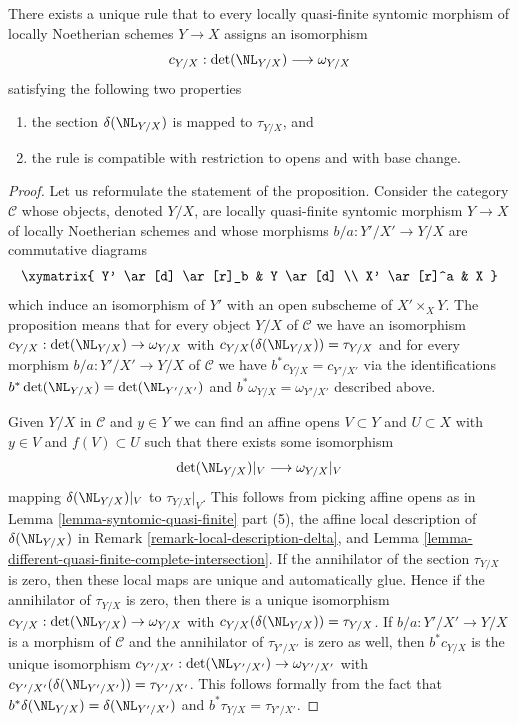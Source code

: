 \begin{proposition}
\label{proposition-tate-map}
There exists a unique rule that to every locally quasi-finite syntomic
morphism of locally Noetherian schemes $Y \to X$ assigns an isomorphism
$$
c_{Y/X} : \det(\NL_{Y/X}) \longrightarrow \omega_{Y/X}
$$
satisfying the following two properties
\begin{enumerate}
\item the section $\delta(\NL_{Y/X})$ is mapped to $\tau_{Y/X}$, and
\item the rule is compatible with restriction to opens and with
base change.
\end{enumerate}
\end{proposition}

\begin{proof}
Let us reformulate the statement of the proposition. Consider the category
$\mathcal{C}$ whose objects, denoted $Y/X$, are locally quasi-finite syntomic
morphism $Y \to X$ of locally Noetherian schemes and whose morphisms
$b/a : Y'/X' \to Y/X$ are commutative diagrams
$$
\xymatrix{
Y' \ar[d] \ar[r]_b & Y \ar[d] \\
X' \ar[r]^a & X
}
$$
which induce an isomorphism of $Y'$ with an open subscheme of
$X' \times_X Y$. The proposition means that for every object
$Y/X$ of $\mathcal{C}$ we have an isomorphism
$c_{Y/X} : \det(\NL_{Y/X}) \to \omega_{Y/X}$
with $c_{Y/X}(\delta(\NL_{Y/X})) = \tau_{Y/X}$
and for every morphism $b/a : Y'/X' \to Y/X$ of $\mathcal{C}$ we have
$b^*c_{Y/X} = c_{Y'/X'}$ via the identifications
$b^*\det(\NL_{Y/X}) = \det(\NL_{Y'/X'})$ and
$b^*\omega_{Y/X} = \omega_{Y'/X'}$ described above.

\medskip\noindent
Given $Y/X$ in $\mathcal{C}$ and $y \in Y$ we can find
an affine opens $V \subset Y$ and $U \subset X$ with
$y \in V$ and $f(V) \subset U$
such that there exists some isomorphism
$$
\det(\NL_{Y/X})|_V \longrightarrow \omega_{Y/X}|_V
$$
mapping $\delta(\NL_{Y/X})|_V$ to $\tau_{Y/X}|_V$. This follows
from picking affine opens as in
Lemma \ref{lemma-syntomic-quasi-finite} part (5), the affine
local description of $\delta(\NL_{Y/X})$ in
Remark \ref{remark-local-description-delta}, and
Lemma \ref{lemma-different-quasi-finite-complete-intersection}.
If the annihilator of the section $\tau_{Y/X}$ is zero, then
these local maps are unique and automatically glue. Hence if the annihilator
of $\tau_{Y/X}$ is zero, then there is a unique isomorphism
$c_{Y/X} : \det(\NL_{Y/X}) \to \omega_{Y/X}$ with
$c_{Y/X}(\delta(\NL_{Y/X})) = \tau_{Y/X}$.
If $b/a : Y'/X' \to Y/X$ is a morphism of $\mathcal{C}$
and the annihilator of $\tau_{Y'/X'}$ is zero as well,
then $b^*c_{Y/X}$ is the unique isomorphism
$c_{Y'/X'} : \det(\NL_{Y'/X'}) \to \omega_{Y'/X'}$ with
$c_{Y'/X'}(\delta(\NL_{Y'/X'})) = \tau_{Y'/X'}$.
This follows formally from the fact that
$b^*\delta(\NL_{Y/X}) = \delta(\NL_{Y'/X'})$ and
$b^*\tau_{Y/X} = \tau_{Y'/X'}$.


\end{proof}
